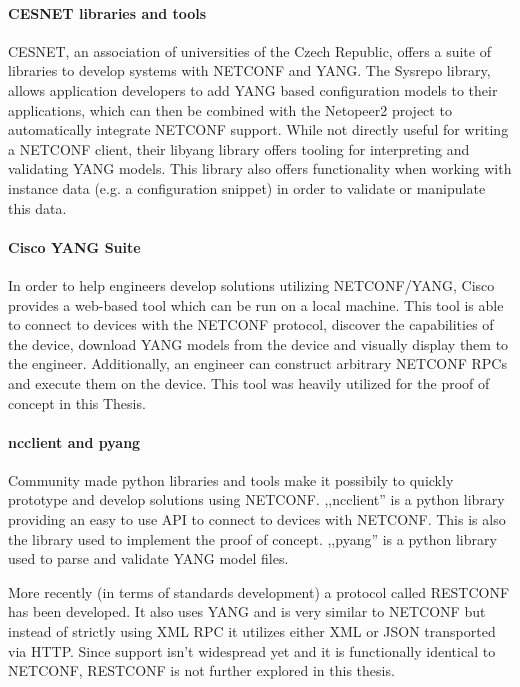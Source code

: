 \paragraph{CESNET libraries and tools} CESNET, an association of universities of the Czech Republic,
offers a suite of libraries to develop systems with NETCONF and YANG.
The Sysrepo library, allows application developers to add YANG based configuration models to their
applications, which can then be combined with the Netopeer2 project to automatically integrate NETCONF
support. While not directly useful for writing a NETCONF client, their libyang library offers
tooling for interpreting and validating YANG models. This library also offers functionality when
working with instance data (e.g. a configuration snippet) in order to validate or manipulate this data.

\paragraph{Cisco YANG Suite} In order to help engineers develop solutions
utilizing NETCONF/YANG, Cisco provides a web-based tool which can be run
on a local machine. This tool is able to connect to devices with the
NETCONF protocol, discover the capabilities of the device, download YANG
models from the device and visually display them to the engineer.
Additionally, an engineer can construct arbitrary NETCONF RPCs and
execute them on the device. This tool was heavily utilized for the
proof of concept in this Thesis.

\paragraph{ncclient and pyang} Community made python libraries and tools
make it possibily to quickly prototype and develop solutions using NETCONF.
,,ncclient'' is a python library providing an easy to use API to connect
to devices with NETCONF. This is also the library used to implement the
proof of concept. ,,pyang'' is a python library used to parse and
validate YANG model files.  

More recently (in terms of standards development) a protocol called RESTCONF
has been developed. It also uses YANG and is very similar to NETCONF but
instead of strictly using XML RPC it utilizes either XML or JSON transported
via HTTP. Since support isn't widespread yet and it is functionally identical
to NETCONF, RESTCONF is not further explored in this thesis.

